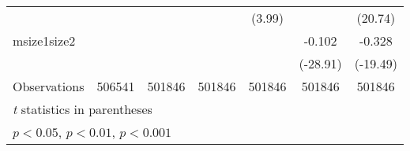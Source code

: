 {\begin{tabular}{l*{6}{c}}
                    &                     &                     &                     &      (3.99)         &                     &     (20.74)         \\
[1em]
msize1size2         &                     &                     &                     &                     &      -0.102\sym{***}&      -0.328\sym{***}\\
                    &                     &                     &                     &                     &    (-28.91)         &    (-19.49)         \\
\hline
Observations        &      506541         &      501846         &      501846         &      501846         &      501846         &      501846         \\
\hline\hline
\multicolumn{7}{l}{\footnotesize \textit{t} statistics in parentheses}\\
\multicolumn{7}{l}{\footnotesize \sym{*} \(p<0.05\), \sym{**} \(p<0.01\), \sym{***} \(p<0.001\)}\\
\end{tabular}
}
